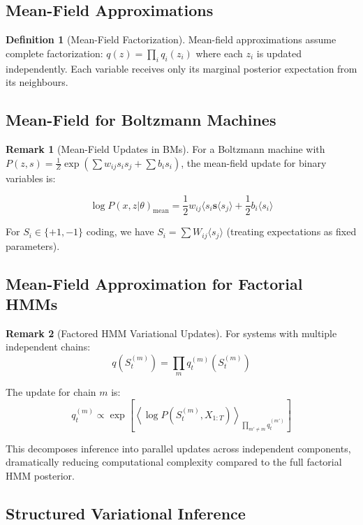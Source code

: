 \documentclass[12pt,a4paper]{article}
\theoremstyle{definition}
\newtheorem{definition}{Definition}[section]
\newtheorem{remark}{Remark}[section]
\begin{document}
\subsection{Mean-Field Approximations}

\begin{definition}[Mean-Field Factorization]
Mean-field approximations assume complete factorization: $q(z) = \prod_i q_i(z_i)$ where each $z_i$ is updated independently. Each variable receives only its marginal posterior expectation from its neighbours.
\end{definition}

\subsection{Mean-Field for Boltzmann Machines}

\begin{remark}[Mean-Field Updates in BMs]
For a Boltzmann machine with $P(z, s) = \frac{1}{Z} \exp\left(\sum w_{ij} s_i s_j + \sum b_i s_i\right)$, the mean-field update for binary variables is:

\[
\log P(x, z | \theta)_{\text{mean}} = \frac{1}{2} w_{ij} \langle s_i \mathbf{s} \langle s_j \rangle + \frac{1}{2} b_i \langle s_i \rangle
\]

For $S_i \in \{+1, -1\}$ coding, we have $S_i = \sum W_{ij} \langle s_j \rangle$ (treating expectations as fixed parameters).
\end{remark}

\subsection{Mean-Field Approximation for Factorial HMMs}

\begin{remark}[Factored HMM Variational Updates]
For systems with multiple independent chains:
\[
q(S_t^{(m)}) = \prod_m q_t^{(m)}(S_t^{(m)})
\]

The update for chain $m$ is:
\[
q_t^{(m)} \propto \exp \left[ \left\langle \log P(S_t^{(m)}, X_{1:T}) \right\rangle_{\prod_{m' \neq m} q_t^{(m')}} \right]
\]

This decomposes inference into parallel updates across independent components, dramatically reducing computational complexity compared to the full factorial HMM posterior.
\end{remark}

\subsection{Structured Variational Inference}
\end{document}
